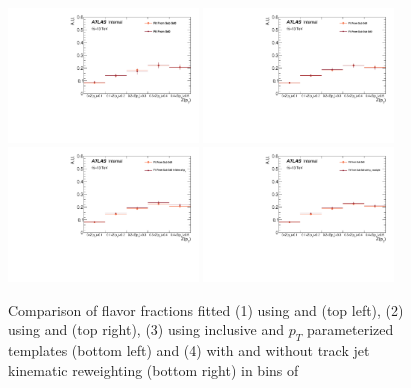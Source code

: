 \begin{figure}[htbp]
  \centering
 \includegraphics[width=0.45\textwidth]{figures/gbb/Sub_Sd0_Fits/Canv_ZpT_leadCrossCheck.pdf}
 \includegraphics[width=0.45\textwidth]{figures/gbb/Sub_Sd0_Fits/Canv_ZpT_subsubCrossCheck.pdf}\\
 \includegraphics[width=0.45\textwidth]{figures/gbb/Sub_Sd0_Fits/Canv_ZpT_ptbinCrossCheck.pdf}
 \includegraphics[width=0.45\textwidth]{figures/gbb/Sub_Sd0_Fits/Canv_ZpT_noreweightCrossCheck.pdf}\\
\caption{Comparison of flavor fractions fitted (1) using \subsdzero and \sdzero (top left), (2) using \subsdzero and \subsubsdzero (top right), (3) using inclusive and $p_T$ parameterized templates (bottom left) and (4) with and without track jet kinematic reweighting (bottom right) in bins of \zpt}
  \label{fig:ZpT-fitfrac-crosscheck}
\end{figure}


